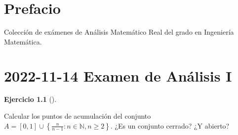 \documentclass[
  a4paper,
]{scrreport}
\theoremstyle{definition}
\newtheorem{exercise}{Ejercicio}[chapter]
\theoremstyle{remark}
\begin{document}
\hypertarget{prefacio}{%
\chapter*{Prefacio}\label{prefacio}}


Colección de exámenes de Análisis Matemático Real del grado en
Ingeniería Matemática.


\hypertarget{examen-de-anuxe1lisis-i}{%
\chapter{\texorpdfstring{2022-11-14 Examen de Análisis
I}{2022-11-14  Examen de Análisis I}}\label{examen-de-anuxe1lisis-i}}

\begin{exercise}[]\protect\hypertarget{exr-1}{}\label{exr-1}

Calcular los puntos de acumulación del conjunto
\(A=[0,1]\cup \left\{\frac{n}{n-1}: n\in\mathbb{N}, n\geq 2\right\}\).
¿Es un conjunto cerrado? ¿Y abierto?

\end{exercise}
\end{document}
